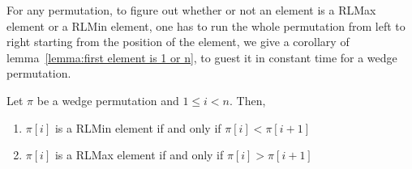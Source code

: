 \documentclass[a4paper]{llncs}
\newcounter{num}
\begin{document}
For any permutation, to figure out whether or not an element is a RLMax element or a RLMin element,
one has to run the whole permutation from left to right starting
from the position of the element, we give a corollary of lemma~\ref{lemma:first element is 1 or n}, to guest it in constant time for a wedge permutation.


\begin{corollary}
\label{corollary:max is ascent}
Let $\pi$ be a wedge permutation and $1 \leq i < n$. Then,
\begin{enumerate}
\item $\pi[i]$ is a RLMin element if and only if $\pi[i]<\pi[i+1]$
\item $\pi[i]$ is a RLMax element if and only if $\pi[i]>\pi[i+1]$
\end{enumerate}

\end{corollary}




%
%
%
%
%
\end{document}
